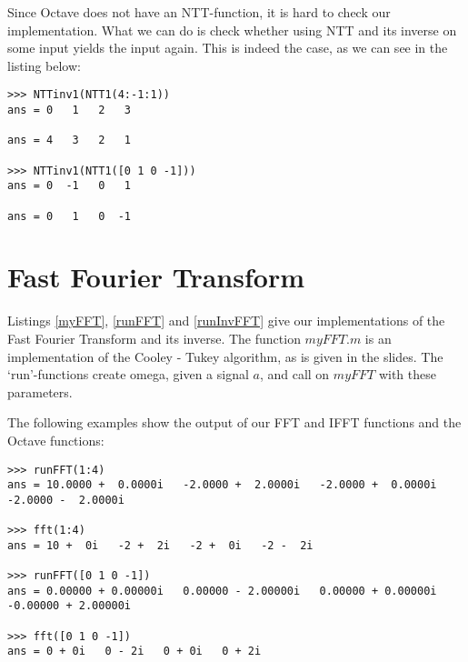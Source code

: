 \documentclass{article}
\begin{document}
Since Octave does not have an NTT-function, it is hard to check our implementation. What we can do is check whether using NTT and its inverse on some input yields the input again. This is indeed the case, as we can see in the listing below:

\begin{lstlisting}
>>> NTTinv1(NTT1(4:-1:1))
ans = 0   1   2   3

ans = 4   3   2   1

>>> NTTinv1(NTT1([0 1 0 -1]))
ans = 0  -1   0   1

ans = 0   1   0  -1
\end{lstlisting}


 
 
 
 
\section{Fast Fourier Transform}
Listings \ref{myFFT}, \ref{runFFT} and \ref{runInvFFT} give our implementations of the Fast Fourier Transform and its inverse. The function $myFFT.m$ is an implementation of the Cooley - Tukey algorithm, as is given in the slides. The `run'-functions create omega, given a signal $a$, and call on $myFFT$ with these parameters. 

The following examples show the output of our FFT and IFFT functions and the Octave functions:

\begin{lstlisting}
>>> runFFT(1:4)
ans = 10.0000 +  0.0000i   -2.0000 +  2.0000i   -2.0000 +  0.0000i   -2.0000 -  2.0000i

>>> fft(1:4)
ans = 10 +  0i   -2 +  2i   -2 +  0i   -2 -  2i

>>> runFFT([0 1 0 -1])
ans = 0.00000 + 0.00000i   0.00000 - 2.00000i   0.00000 + 0.00000i   -0.00000 + 2.00000i

>>> fft([0 1 0 -1])
ans = 0 + 0i   0 - 2i   0 + 0i   0 + 2i
\end{lstlisting}

 
 
 
\end{document}
